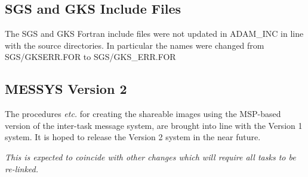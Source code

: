 \subsection{SGS and GKS Include Files}
The SGS and GKS Fortran include files were not updated in ADAM\_INC in line 
with the source directories. In particular the names were changed from
SGS/GKSERR.FOR to SGS/GKS\_ERR.FOR

\subsection{MESSYS Version 2}
The procedures {\em etc.} for creating the shareable images using the
MSP-based version of the inter-task message system, are brought into line
with the Version 1 system.
It is hoped to release the Version 2 system in the near future. 

{\em This is expected to coincide with other changes which will require all 
tasks to be re-linked.}

